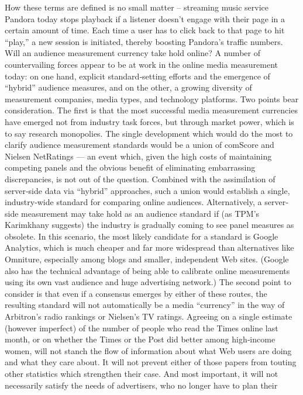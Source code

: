 How these terms are defined is no small matter – streaming music service
Pandora today stops playback if a listener doesn’t engage with their page
in a certain amount of time. Each time a user has to click back to that page
to hit ``play,'' a new session is initiated, thereby boosting Pandora’s traffic
numbers.
Will an audience measurement currency take hold online?
A number of countervailing forces appear to be at work in the online
media measurement today: on one hand, explicit standard‐setting efforts
and the emergence of ``hybrid'' audience measures, and on the other, a
growing diversity of measurement companies, media types, and
technology platforms.
Two points bear consideration. The first is that the most successful media
measurement currencies have emerged not from industry task forces, but
through market power, which is to say research monopolies. The single
development which would do the most to clarify audience measurement
standards would be a union of comScore and Nielsen NetRatings — an
event which, given the high costs of maintaining competing panels and
the obvious benefit of eliminating embarrassing discrepancies, is not out
of the question.
Combined with the assimilation of server‐side data via ``hybrid''
approaches, such a union would establish a single, industry‐wide
standard for comparing online audiences. Alternatively, a server‐side
measurement may take hold as an audience standard if (as TPM’s
Karimkhany suggests) the industry is gradually coming to see panel
measures as obsolete. In this scenario, the most likely candidate for a
standard is Google Analytics, which is much cheaper and far more
widespread than alternatives like Omniture, especially among blogs and
smaller, independent Web sites. (Google also has the technical advantage
of being able to calibrate online measurements using its own vast
audience and huge advertising network.)
The second point to consider is that even if a consensus emerges by either
of these routes, the resulting standard will not automatically be a media
``currency'' in the way of Arbitron’s radio rankings or Nielsen’s TV
ratings. Agreeing on a single estimate (however imperfect) of the number
of people who read the Times online last month, or on whether the Times
or the Post did better among high‐income women, will not stanch the flow
of information about what Web users are doing and what they care about.
It will not prevent either of those papers from touting other statistics
which strengthen their case. And most important, it will not necessarily
satisfy the needs of advertisers, who no longer have to plan their
